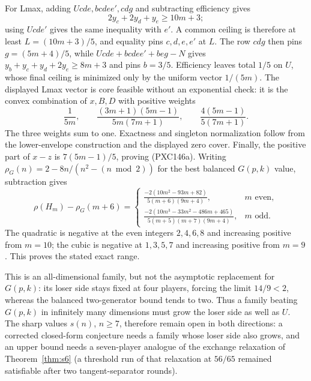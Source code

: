 \documentclass[11pt]{article}
\begin{document}
For Lmax, adding \(Ucde,bcdee',cdg\) and subtracting efficiency gives
\[
 2y_c+2y_d+y_e\ge10m+3;
\]
using \(Ucde'\) gives the same inequality with \(e'\).  A common ceiling is
therefore at least \(L=(10m+3)/5\), and equality pins
\(c,d,e,e'\) at \(L\).  The row \(cdg\) then pins
\(g=(5m+4)/5\), while \(Ucde+bcdee'+beg-N\) gives
\(y_b+y_c+y_d+2y_e\ge8m+3\) and pins \(b=3/5\).
Efficiency leaves total \(1/5\) on \(U\), whose final ceiling is minimized
only by the uniform vector \(1/(5m)\).  The displayed Lmax vector is core
feasible without an exponential check: it is the convex combination of
\(x,B,D\) with positive weights
\[
 \frac1{5m},\qquad
 \frac{(3m+1)(5m-1)}{5m(7m+1)},\qquad
 \frac{4(5m-1)}{5(7m+1)}.
\]
The three weights sum to one.  Exactness and singleton normalization follow
from the lower-envelope construction and the displayed zero cover.  Finally,
the positive part of \(x-z\) is \(7(5m-1)/5\), proving (PXC146a).
Writing
\(\rho_G(n)=2-8n/(n^2-(n\bmod2))\) for the best balanced
\(G(p,k)\) value, subtraction gives
\[
 \rho(H_m)-\rho_G(m+6)=
 \begin{cases}
 \displaystyle\frac{-2(10m^2-93m+82)}{5(m+6)(9m+4)},&m\text{ even},\\[3pt]
 \displaystyle\frac{-2(10m^3-33m^2-486m+465)}
 {5(m+5)(m+7)(9m+4)},&m\text{ odd}.
 \end{cases}
\]
The quadratic is negative at the even integers \(2,4,6,8\) and increasing
positive from \(m=10\); the cubic is negative at \(1,3,5,7\) and increasing
positive from \(m=9\).  This proves the stated exact range.

This is an all-dimensional family, but not the asymptotic replacement for
\(G(p,k)\): its loser side stays fixed at four players, forcing the limit
\(14/9<2\), whereas the balanced two-generator bound tends to two.  Thus a
family beating \(G(p,k)\) in infinitely many dimensions must grow the loser
side as well as \(U\).  The sharp values \(s(n)\),
\(n\ge7\), therefore remain open in both directions: a corrected
closed-form conjecture needs a family whose loser side also grows, and an
upper bound needs a seven-player analogue of the exchange relaxation of
Theorem~\ref{thm:s6} (a threshold run of that relaxation at \(56/65\)
remained satisfiable after two tangent-separator rounds).
\end{document}
